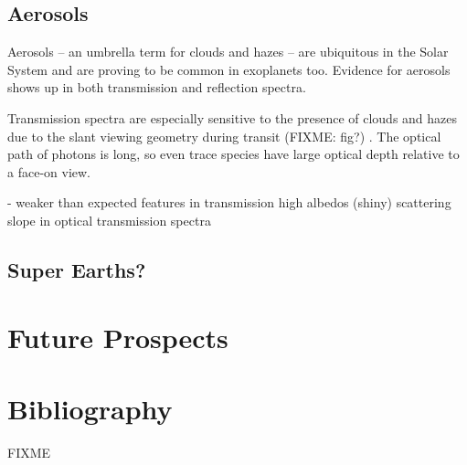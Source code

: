 \documentclass[graybox,natbib,nosecnum]{svmult}
\begin{document}
\subsection{Aerosols}
Aerosols -- an umbrella term for clouds and hazes -- are ubiquitous in the Solar System and are proving to be common in exoplanets too. Evidence for aerosols shows up in both transmission and reflection spectra.

Transmission spectra are especially sensitive to the presence of clouds and hazes due to the slant viewing geometry during transit (FIXME: fig?) \citep{fortney05}. The optical path of photons is long, so even trace species have large optical depth relative to a face-on view. 

- weaker than expected features in transmission
high albedos (shiny)
scattering slope in optical transmission spectra

\subsection{Super Earths?}

\section{Future Prospects}

\section{Bibliography}

\begin{acknowledgement}
FIXME
\end{acknowledgement}

\end{document}
